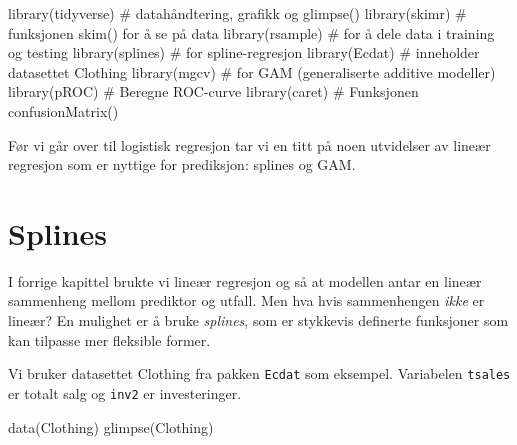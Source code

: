 \documentclass[
  letterpaper,
  DIV=11,
  numbers=noendperiod]{scrreprt}
\newenvironment{Shaded}{\begin{snugshade}}{\end{snugshade}}
\newcommand{\CommentTok}[1]{\textcolor[rgb]{0.37,0.37,0.37}{#1}}
\newcommand{\FunctionTok}[1]{\textcolor[rgb]{0.28,0.35,0.67}{#1}}
\newcommand{\NormalTok}[1]{\textcolor[rgb]{0.00,0.23,0.31}{#1}}
\begin{document}
\begin{Shaded}
\begin{Highlighting}[]
\FunctionTok{library}\NormalTok{(tidyverse)   }\CommentTok{\# datahåndtering, grafikk og glimpse()}
\FunctionTok{library}\NormalTok{(skimr)       }\CommentTok{\# funksjonen skim() for å se på data}
\FunctionTok{library}\NormalTok{(rsample)     }\CommentTok{\# for å dele data i training og testing}
\FunctionTok{library}\NormalTok{(splines)     }\CommentTok{\# for spline{-}regresjon}
\FunctionTok{library}\NormalTok{(Ecdat)       }\CommentTok{\# inneholder datasettet Clothing}
\FunctionTok{library}\NormalTok{(mgcv)        }\CommentTok{\# for GAM (generaliserte additive modeller)}
\FunctionTok{library}\NormalTok{(pROC)        }\CommentTok{\# Beregne ROC{-}curve}
\FunctionTok{library}\NormalTok{(caret)       }\CommentTok{\# Funksjonen confusionMatrix()}
\end{Highlighting}
\end{Shaded}

Før vi går over til logistisk regresjon tar vi en titt på noen
utvidelser av lineær regresjon som er nyttige for prediksjon: splines og
GAM.

\section{Splines}\label{splines}

I forrige kapittel brukte vi lineær regresjon og så at modellen antar en
lineær sammenheng mellom prediktor og utfall. Men hva hvis sammenhengen
\emph{ikke} er lineær? En mulighet er å bruke \emph{splines}, som er
stykkevis definerte funksjoner som kan tilpasse mer fleksible former.

Vi bruker datasettet Clothing fra pakken \texttt{Ecdat} som eksempel.
Variabelen \texttt{tsales} er totalt salg og \texttt{inv2} er
investeringer.

\begin{Shaded}
\begin{Highlighting}[]
\FunctionTok{data}\NormalTok{(Clothing)}
\FunctionTok{glimpse}\NormalTok{(Clothing)}
\end{Highlighting}
\end{Shaded}
\end{document}
